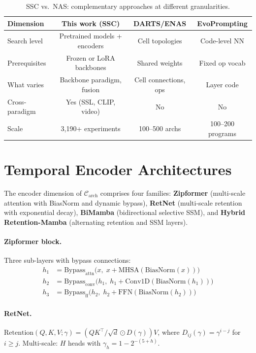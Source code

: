 \documentclass{article}
\newcommand{\Cspace}{\mathcal{C}}
\begin{document}
\begin{table}[ht]
\centering
\caption{SSC vs.\ NAS: complementary approaches at different granularities.}
\label{tab:ssc_vs_nas}
\small
\begin{tabular}{@{}lccc@{}}
\toprule
Dimension & This work (SSC) & DARTS/ENAS & EvoPrompting \\
\midrule
Search level & Pretrained models + encoders & Cell topologies & Code-level NN \\
Prerequisites & Frozen or LoRA backbones & Shared weights & Fixed op vocab \\
What varies & Backbone paradigm, fusion & Cell connections, ops & Layer code \\
Cross-paradigm & Yes (SSL, CLIP, video) & No & No \\
Scale & 3{,}190+ experiments & 100--500 archs & 100--200 programs \\
\bottomrule
\end{tabular}
\end{table}


\section{Temporal Encoder Architectures}
\label{app:architectures}

The encoder dimension of $\Cspace_{\mathrm{arch}}$ comprises four families:
\textbf{Zipformer} \citep{yao2023zipformer} (multi-scale attention with BiasNorm and dynamic bypass),
\textbf{RetNet} \citep{sun2023retnet} (multi-scale retention with exponential decay),
\textbf{BiMamba} \citep{gu2023mamba} (bidirectional selective SSM), and
\textbf{Hybrid Retention-Mamba} (alternating retention and SSM layers).

\paragraph{Zipformer block.}
Three sub-layers with bypass connections:
\begin{align}
h_1 &= \mathrm{Bypass}_{\mathrm{attn}}\big(x,\; x + \mathrm{MHSA}(\mathrm{BiasNorm}(x))\big) \nonumber \\
h_2 &= \mathrm{Bypass}_{\mathrm{conv}}\big(h_1,\; h_1 + \mathrm{Conv1D}(\mathrm{BiasNorm}(h_1))\big) \\
h_3 &= \mathrm{Bypass}_{\mathrm{ff}}\big(h_2,\; h_2 + \mathrm{FFN}(\mathrm{BiasNorm}(h_2))\big) \nonumber
\end{align}

\paragraph{RetNet.}
$\mathrm{Retention}(Q, K, V; \gamma) = (QK^\top / \sqrt{d} \odot D(\gamma)) V$, where $D_{ij}(\gamma) = \gamma^{i-j}$ for $i \geq j$. Multi-scale: $H$ heads with $\gamma_h = 1 - 2^{-(5+h)}$.
\end{document}
